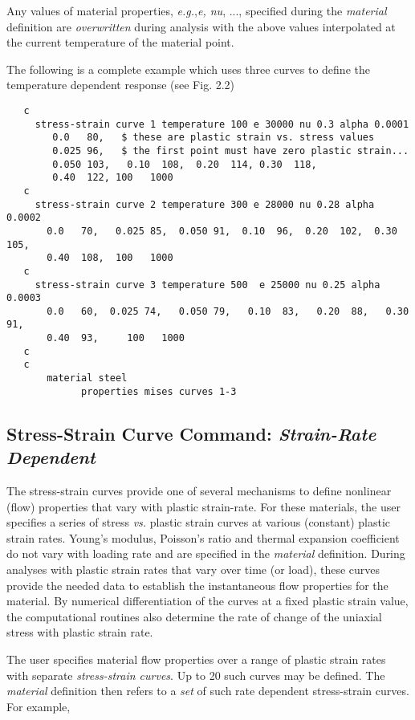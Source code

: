 \documentclass[11pt]{report}
\numberwithin{equation}{section}
\newcommand{\nin} {\noindent}
\newcommand{\eg}{\emph{e.g.},\xspace}
\newcommand{\ti}{\emph}
\begin{document}
Any values of material properties, \eg \ti{e, nu}, ..., specified during the \ti{material} definition are \ti{overwritten} during analysis with
the above values interpolated at the current temperature of the material point.

The following is a complete example which uses three curves to define the
temperature dependent response (see Fig. 2.2)

\small
\begin{verbatim}
   c   
     stress-strain curve 1 temperature 100 e 30000 nu 0.3 alpha 0.0001
        0.0   80,   $ these are plastic strain vs. stress values
        0.025 96,   $ the first point must have zero plastic strain...
        0.050 103,   0.10  108,  0.20  114, 0.30  118,
        0.40  122, 100   1000
   c
     stress-strain curve 2 temperature 300 e 28000 nu 0.28 alpha 0.0002
       0.0   70,   0.025 85,  0.050 91,  0.10  96,  0.20  102,  0.30  105,
       0.40  108,  100   1000
   c
     stress-strain curve 3 temperature 500  e 25000 nu 0.25 alpha 0.0003
       0.0   60,  0.025 74,   0.050 79,   0.10  83,   0.20  88,   0.30  91,
       0.40  93,     100   1000
   c 
   c 
       material steel
             properties mises curves 1-3
\end{verbatim}
\normalsize
%
\subsection{Stress-Strain Curve Command: \ti{Strain-Rate Dependent}}
\nin
The stress-strain curves provide one of several mechanisms 
to define nonlinear (flow) properties that vary with plastic strain-rate.
For these materials, the user specifies a series of stress \ti{vs.} plastic strain
curves at various (constant) plastic strain rates. Young's modulus, Poisson's
ratio and thermal expansion coefficient do not vary with loading rate and are
specified in the \ti{material} definition. During analyses with plastic strain rates
that vary over time (or load), these curves provide the needed data to establish
the instantaneous flow properties for the material. By numerical differentiation
of the curves at a fixed plastic strain value, the computational routines also
determine the rate of change of the uniaxial stress with plastic strain rate.

The user specifies material flow properties over a range of plastic strain rates
with separate \ti{stress-strain curves}. Up to 20 such curves may be defined. The
\ti{material} definition then refers to a \ti{set} of such rate dependent stress-strain
curves. For example,
\end{document}
